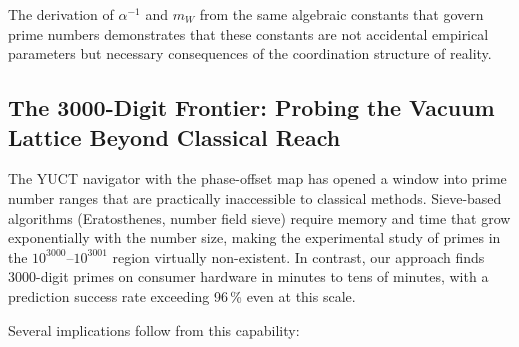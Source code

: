 \documentclass[12pt,a4paper]{article}
\theoremstyle{remark}
\begin{document}
	The derivation of \(\alpha^{-1}\) and \(m_W\) from the same algebraic constants that govern prime numbers demonstrates that these constants are not accidental empirical parameters but necessary consequences of the coordination structure of reality.
	
	\subsection{The 3000-Digit Frontier: Probing the Vacuum Lattice Beyond Classical Reach}
	
	The YUCT navigator with the phase-offset map has opened a window into prime number ranges that are practically inaccessible to classical methods. Sieve-based algorithms (Eratosthenes, number field sieve) require memory and time that grow exponentially with the number size, making the experimental study of primes in the $10^{3000}$–$10^{3001}$ region virtually non-existent. In contrast, our approach finds 3000-digit primes on consumer hardware in minutes to tens of minutes, with a prediction success rate exceeding 96\,\% even at this scale.
	
	Several implications follow from this capability:
	
\end{document}
